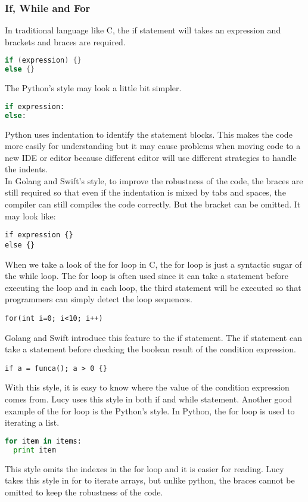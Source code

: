 \subsubsection{If, While and For}
In traditional language like C, the if statement will takes an expression and brackets and braces are required.
\begin{lstlisting}[language=c]
if (expression) {}
else {}
\end{lstlisting}
The Python's style may look a little bit simpler.
\begin{lstlisting}[language=python]
if expression:
else:
\end{lstlisting}
Python uses indentation to identify the statement blocks. This makes the code more easily for understanding but it may cause problems when moving code to a new IDE or editor because different editor will use different strategies to handle the indents. \\
In Golang and Swift's style, to improve the robustness of the code, the braces are still required so that even if the indentation is mixed by tabs and spaces, the compiler can still compiles the code correctly. But the bracket can be omitted. It may look like:
\begin{lstlisting}
if expression {}
else {}
\end{lstlisting}
When we take a look of the for loop in C, the for loop is just a syntactic sugar of the while loop. The for loop is often used since it can take a statement before executing the loop and in each loop, the third statement will be executed so that programmers can simply detect the loop sequences.
\begin{lstlisting}
for(int i=0; i<10; i++)
\end{lstlisting}
Golang and Swift introduce this feature to the if statement. The if statement can take a statement before checking the boolean result of the condition expression.
\begin{lstlisting}
if a = funca(); a > 0 {}
\end{lstlisting}
With this style, it is easy to know where the value of the condition expression comes from. Lucy uses this style in both if and while statement.
Another good example of the for loop is the Python's style. In Python, the for loop is used to iterating a list.
\begin{lstlisting}[language=python]
for item in items:
  print item
\end{lstlisting}
This style omits the indexes in the for loop and it is easier for reading. Lucy takes this style in for to iterate arrays, but unlike python, the braces cannot be omitted to keep the robustness of the code.


